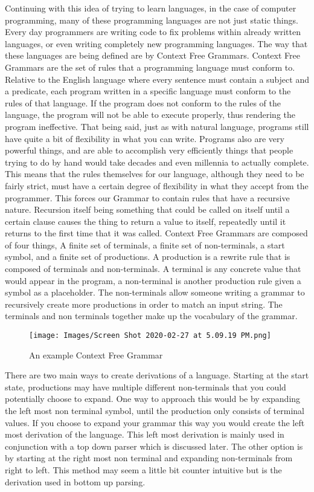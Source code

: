 \documentclass[sigconf]{acmart}
\begin{document}
Continuing with this idea of trying to learn languages, in the case of computer programming, many of these programming languages are not just static things. Every day programmers are writing code to fix problems within already written languages, or even writing completely new programming languages. The way that these languages are being defined are by Context Free Grammars. Context Free Grammars are the set of rules that a programming language must conform to. Relative to the English language where every sentence must contain a subject and a predicate, each program written in a specific language must conform to the rules of that language. If the program does not conform to the rules of the language, the program will not be able to execute properly, thus rendering the program ineffective. That being said, just as with natural language, programs still have quite a bit of flexibility in what you can write. Programs also are very powerful things, and are able to accomplish very efficiently things that people trying to do by hand would take decades and even millennia to actually complete. This means that the rules themselves for our language, although they need to be fairly strict, must have a certain degree of flexibility in what they accept from the programmer. This forces our Grammar to contain rules that have a recursive nature. Recursion itself being something that could be called on itself until a certain clause causes the thing to return a value to itself, repeatedly until it returns to the first time that it was called. 
\newline 
Context Free Grammars are composed of four things, A finite set of terminals, a finite set of non-terminals, a start symbol, and a finite set of productions. A production is a rewrite rule that is composed of terminals and non-terminals. A terminal is any concrete value that would appear in the program, a non-terminal is another production rule given a symbol as a placeholder. The non-terminals allow someone writing a grammar to recursively create more productions in order to match an input string. The terminals and non terminals together make up the vocabulary of the grammar.
\newline
\begin{figure}
  \texttt{[image: Images/Screen Shot 2020-02-27 at 5.09.19 PM.png]}
  \caption{An example Context Free Grammar}
\end{figure}
\newline
There are two main ways to create derivations of a language. Starting at the start state, productions may have multiple different non-terminals that you could potentially choose to expand. One way to approach this would be by expanding the left most non terminal symbol, until the production only consists of terminal values. If you choose to expand your grammar this way you would create the left most derivation of the language. This left most derivation is mainly used in conjunction with a top down parser which is discussed later. The other option is by starting at the right most non terminal and expanding non-terminals from right to left. This method may seem a little bit counter intuitive but is the derivation used in bottom up parsing.
\end{document}
